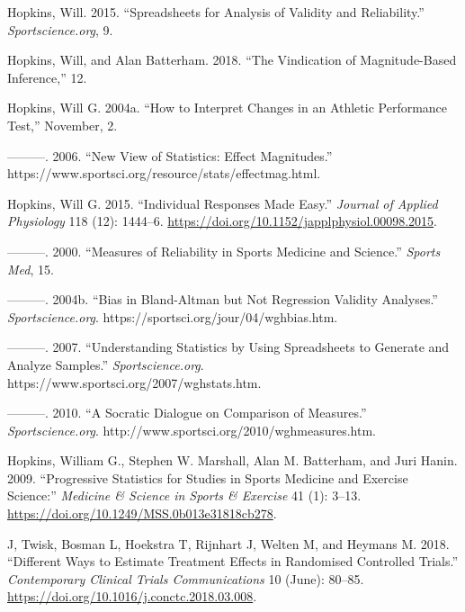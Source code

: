 \documentclass[
]{book}
\newlength{\cslhangindent}
\newenvironment{cslreferences}%
  {\setlength{\parindent}{0pt}%
  \everypar{\setlength{\hangindent}{\cslhangindent}}\ignorespaces}%
  {\par}
\begin{document}
\begin{cslreferences}
\leavevmode\hypertarget{ref-hopkinsSpreadsheetsAnalysisValidity2015}{}%
Hopkins, Will. 2015. ``Spreadsheets for Analysis of Validity and Reliability.'' \emph{Sportscience.org}, 9.

\leavevmode\hypertarget{ref-hopkinsVindicationMagnitudeBasedInference2018}{}%
Hopkins, Will, and Alan Batterham. 2018. ``The Vindication of Magnitude-Based Inference,'' 12.

\leavevmode\hypertarget{ref-hopkinsHowInterpretChanges2004}{}%
Hopkins, Will G. 2004a. ``How to Interpret Changes in an Athletic Performance Test,'' November, 2.

\leavevmode\hypertarget{ref-hopkinsNewViewStatistics2006}{}%
---------. 2006. ``New View of Statistics: Effect Magnitudes.'' https://www.sportsci.org/resource/stats/effectmag.html.

\leavevmode\hypertarget{ref-hopkinsIndividualResponsesMade2015}{}%
Hopkins, Will G. 2015. ``Individual Responses Made Easy.'' \emph{Journal of Applied Physiology} 118 (12): 1444--6. \url{https://doi.org/10.1152/japplphysiol.00098.2015}.

\leavevmode\hypertarget{ref-hopkinsMeasuresReliabilitySports2000}{}%
---------. 2000. ``Measures of Reliability in Sports Medicine and Science.'' \emph{Sports Med}, 15.

\leavevmode\hypertarget{ref-hopkinsBiasBlandAltmanNot2004}{}%
---------. 2004b. ``Bias in Bland-Altman but Not Regression Validity Analyses.'' \emph{Sportscience.org}. https://sportsci.org/jour/04/wghbias.htm.

\leavevmode\hypertarget{ref-hopkinsUnderstandingStatisticsUsing2007}{}%
---------. 2007. ``Understanding Statistics by Using Spreadsheets to Generate and Analyze Samples.'' \emph{Sportscience.org}. https://www.sportsci.org/2007/wghstats.htm.

\leavevmode\hypertarget{ref-hopkinsSocraticDialogueComparison2010}{}%
---------. 2010. ``A Socratic Dialogue on Comparison of Measures.'' \emph{Sportscience.org}. http://www.sportsci.org/2010/wghmeasures.htm.

\leavevmode\hypertarget{ref-hopkinsProgressiveStatisticsStudies2009}{}%
Hopkins, William G., Stephen W. Marshall, Alan M. Batterham, and Juri Hanin. 2009. ``Progressive Statistics for Studies in Sports Medicine and Exercise Science:'' \emph{Medicine \& Science in Sports \& Exercise} 41 (1): 3--13. \url{https://doi.org/10.1249/MSS.0b013e31818cb278}.

\leavevmode\hypertarget{ref-jDifferentWaysEstimate2018}{}%
J, Twisk, Bosman L, Hoekstra T, Rijnhart J, Welten M, and Heymans M. 2018. ``Different Ways to Estimate Treatment Effects in Randomised Controlled Trials.'' \emph{Contemporary Clinical Trials Communications} 10 (June): 80--85. \url{https://doi.org/10.1016/j.conctc.2018.03.008}.


\end{cslreferences}
\end{document}
